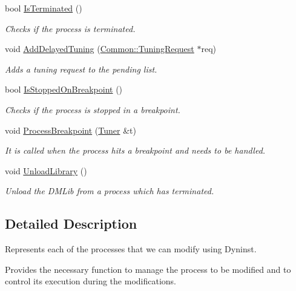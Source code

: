 \begin{DoxyCompactItemize}
bool \hyperlink{class_task_a2a65e096239de200eafa7f37e104a830}{Is\-Terminated} ()
\begin{DoxyCompactList}\small\item\em Checks if the process is terminated. \end{DoxyCompactList}\item 
void \hyperlink{class_task_a10e365e3c6b897c55a3097ac3450dc7a}{Add\-Delayed\-Tuning} (\hyperlink{class_common_1_1_tuning_request}{Common\-::\-Tuning\-Request} $\ast$req)
\begin{DoxyCompactList}\small\item\em Adds a tuning request to the pending list. \end{DoxyCompactList}\item 
bool \hyperlink{class_task_a3d665187f05c68a2f88fcf4e4592e4c0}{Is\-Stopped\-On\-Breakpoint} ()
\begin{DoxyCompactList}\small\item\em Checks if the process is stopped in a breakpoint. \end{DoxyCompactList}\item 
void \hyperlink{class_task_a3a884f2e52a962062a748ca2da93f338}{Process\-Breakpoint} (\hyperlink{class_tuner}{Tuner} \&t)
\begin{DoxyCompactList}\small\item\em It is called when the process hits a breakpoint and needs to be handled. \end{DoxyCompactList}\item 
\hypertarget{class_task_a3e85217f0de32db942ac280342af0d48}{void \hyperlink{class_task_a3e85217f0de32db942ac280342af0d48}{Unload\-Library} ()}\label{class_task_a3e85217f0de32db942ac280342af0d48}

\begin{DoxyCompactList}\small\item\em Unload the D\-M\-Lib from a process which has terminated. \end{DoxyCompactList}\end{DoxyCompactItemize}


\subsection{Detailed Description}
Represents each of the processes that we can modify using Dyninst. 

Provides the necessary function to manage the process to be modified and to control its execution during the modifications.

